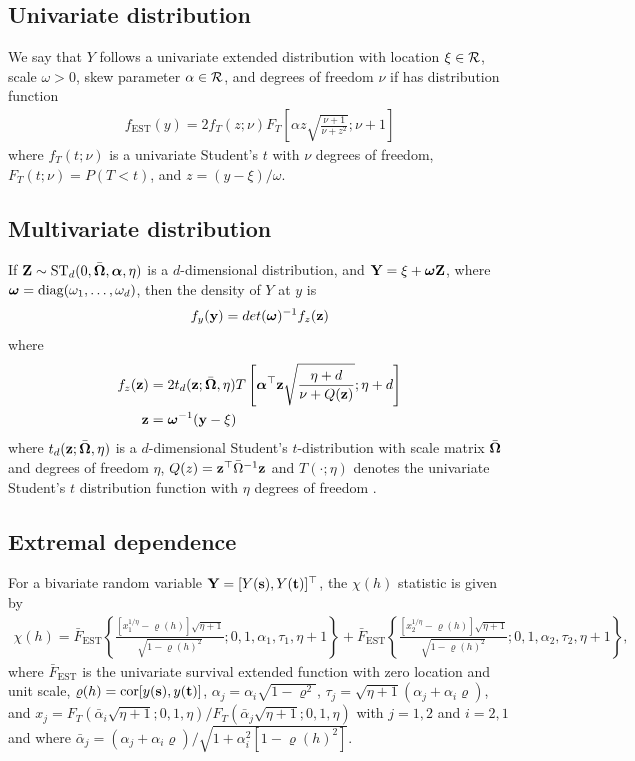 \documentclass[useAMS,usenatbib,referee]{biomweb}
\begin{document}
\subsection*{Univariate \skewt distribution}
We say that $Y$ follows a univariate extended \skewt distribution with location $\xi \in \calR$, scale $\omega > 0$, skew parameter $\alpha \in \calR$, and degrees of freedom $\nu$ if has distribution function
\begin{align}
  f_{\text{EST}}(y) = 2 f_T (z; \nu) F_T\left[ \alpha z \sqrt{ \frac{ \nu + 1 }{ \nu + z^2}}; \nu + 1 \right]
\end{align}
where $f_T(t; \nu)$ is a univariate Student's $t$ with $\nu$ degrees of freedom, $F_T(t; \nu) = P(T < t)$, and \hbox{$z = (y - \xi) / \omega$}.

\subsection*{Multivariate \skewt distribution}
If $\mbox{\bf Z} \sim \text{ST}_d(0, \bar{\mbox{\boldmath $\Omega$}}, \mbox{\boldmath $\alpha$}, \eta)$ is a $d$-dimensional \skewt distribution, and $\mbox{\bf Y} = \xi + \mbox{\boldmath $\omega$} \mbox{\bf Z}$, where $\mbox{\boldmath $\omega$} = \text{diag}(\omega_1, \ldots, \omega_d)$, then the density of $Y$ at $y$ is
\begin{align}
  f_y(\mbox{\bf y}) = det(\mbox{\boldmath $\omega$})^{-1} f_z(\mbox{\bf z})
\end{align}
where
\begin{align}
  f_z(\mbox{\bf z}) &= 2 t_d(\mbox{\bf z}; \bar{\mbox{\boldmath $\Omega$}}, \eta) T \left[ \mbox{\boldmath $\alpha$}^\top \mbox{\bf z} \sqrt{ \frac{\eta + d}{\nu + Q(\mbox{\bf z})} }; \eta + d\right] \\
  \mbox{\bf z} &= \mbox{\boldmath $\omega$}^{-1}(\mbox{\bf y} - \xi)
\end{align}
where $t_d(\mbox{\bf z}; \bar{\mbox{\boldmath $\Omega$}}, \eta)$ is a $d$-dimensional Student's $t$-distribution with scale matrix $\bar{\mbox{\boldmath $\Omega$}}$ and degrees of freedom $\eta$, $Q(z) = \mbox{\bf z}^\top \bar{\Omega}^{-1}\mbox{\bf z}$ and $T(\cdot; \eta)$ denotes the univariate Student's $t$ distribution function with $\eta$ degrees of freedom \citep{Azzalini2014}.

\subsection*{Extremal dependence}
For a bivariate \skewt random variable $\mbox{\bf Y} = [Y(\mbox{\bf s}), Y(\mbox{\bf t})]^\top$, the $\chi(h)$ statistic \citep{Padoan2011} is given by
\begin{align} \label{steq:chiskew-t}
  \chi(h) = \bar{F}_{\text{EST}}\left\{ \frac{[x_1^{1 / \eta} - \varrho(h)] \sqrt{\eta + 1} }{\sqrt{1 - \varrho(h)^2}}; 0, 1, \alpha_1, \tau_1, \eta + 1 \right\} + \bar{F}_{\text{EST}}\left\{ \frac{ [x_2^{1 / \eta} - \varrho(h)] \sqrt{\eta + 1} }{ \sqrt{1 - \varrho(h)^2} }; 0, 1, \alpha_2, \tau_2, \eta + 1 \right\},
\end{align}
where $\bar{F}_{\text{EST}}$ is the univariate survival extended \skewt function with zero location and unit scale, \hbox{$\varrho(h) = \text{cor}[y(\mbox{\bf s}), y(\mbox{\bf t})]$}, $\alpha_j = \alpha_i \sqrt{1 - \varrho^2}$, $\tau_j = \sqrt{\eta + 1}(\alpha_j + \alpha_i \varrho)$, and $x_j = F_T(\bar{\alpha}_i \sqrt{\eta + 1}; 0, 1, \eta) / F_T(\bar{\alpha}_j \sqrt{\eta + 1}; 0, 1, \eta)$ with $j = 1, 2$ and $i = 2, 1$ and where $\bar{\alpha}_j = (\alpha_j + \alpha_i \varrho) / \sqrt{ 1 + \alpha_i^2 [1 - \varrho(h)^2]}$.
\end{document}
